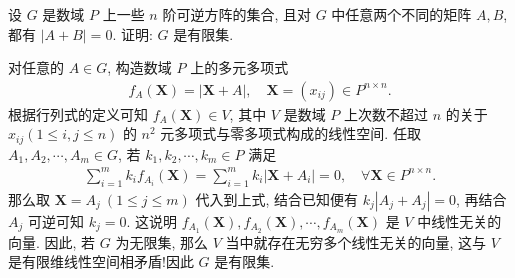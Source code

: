 \documentclass[../../main.tex]{subfiles}%
\begin{document}
\begin{example}
设 \(G\) 是数域 \(P\) 上一些 \(n\) 阶可逆方阵的集合, 且对 \(G\) 中任意两个不同的矩阵 \(A,B\), 都有 \(|A+B|=0\). 证明: \(G\) 是有限集.
\end{example}
\begin{solution}
对任意的 \(A \in G\), 构造数域 \(P\) 上的多元多项式
\begin{align*}
f_A(\bm{X}) = |\bm{X} + A|, \quad \bm{X} = (x_{ij}) \in P^{n \times n}.
\end{align*}
根据行列式的定义可知 \(f_A(\bm{X}) \in V\), 其中 \(V\) 是数域 \(P\) 上次数不超过 \(n\) 的关于 \(x_{ij} (1 \leqslant i,j \leqslant n)\) 的 \(n^2\) 元多项式与零多项式构成的线性空间. 任取 \(A_1,A_2,\cdots,A_m \in G\), 若 \(k_1,k_2,\cdots,k_m \in P\) 满足
\begin{align*}
\sum\limits_{i=1}^{m} k_i f_{A_i}(\bm{X}) = \sum\limits_{i=1}^{m} k_i |\bm{X} + A_i| = 0, \quad \forall \bm{X} \in P^{n \times n}.
\end{align*}
那么取 \(\bm{X} = A_j \ (1 \leqslant j \leqslant m)\) 代入到上式, 结合已知便有 \(k_j |A_j + A_j| = 0\), 再结合 \(A_j\) 可逆可知 \(k_j = 0\). 这说明 \(f_{A_1}(\bm{X}), f_{A_2}(\bm{X}), \cdots, f_{A_m}(\bm{X})\) 是 \(V\) 中线性无关的向量. 因此, 若 \(G\) 为无限集, 那么 \(V\) 当中就存在无穷多个线性无关的向量, 这与 \(V\) 是有限维线性空间相矛盾!因此 \(G\) 是有限集.
\end{solution}
\end{document}
